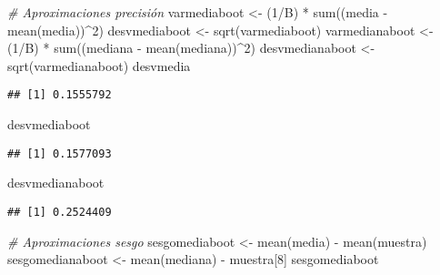 \documentclass[
]{book}
\newenvironment{Shaded}{\begin{snugshade}}{\end{snugshade}}
\newcommand{\CommentTok}[1]{\textcolor[rgb]{0.56,0.35,0.01}{\textit{#1}}}
\newcommand{\DecValTok}[1]{\textcolor[rgb]{0.00,0.00,0.81}{#1}}
\newcommand{\FunctionTok}[1]{\textcolor[rgb]{0.00,0.00,0.00}{#1}}
\newcommand{\NormalTok}[1]{#1}
\newcommand{\OtherTok}[1]{\textcolor[rgb]{0.56,0.35,0.01}{#1}}
\newcommand{\SpecialCharTok}[1]{\textcolor[rgb]{0.00,0.00,0.00}{#1}}
\theoremstyle{break}
\theoremstyle{definition}
\theoremstyle{definition}
\theoremstyle{definition}
\theoremstyle{definition}
\theoremstyle{remark}
\begin{document}
\begin{Shaded}
\begin{Highlighting}[]
\CommentTok{\# Aproximaciones precisión}
\NormalTok{varmediaboot }\OtherTok{\textless{}{-}}\NormalTok{ (}\DecValTok{1}\SpecialCharTok{/}\NormalTok{B) }\SpecialCharTok{*} \FunctionTok{sum}\NormalTok{((media }\SpecialCharTok{{-}} \FunctionTok{mean}\NormalTok{(media))}\SpecialCharTok{\^{}}\DecValTok{2}\NormalTok{)}
\NormalTok{desvmediaboot }\OtherTok{\textless{}{-}} \FunctionTok{sqrt}\NormalTok{(varmediaboot)}
\NormalTok{varmedianaboot }\OtherTok{\textless{}{-}}\NormalTok{ (}\DecValTok{1}\SpecialCharTok{/}\NormalTok{B) }\SpecialCharTok{*} \FunctionTok{sum}\NormalTok{((mediana }\SpecialCharTok{{-}} \FunctionTok{mean}\NormalTok{(mediana))}\SpecialCharTok{\^{}}\DecValTok{2}\NormalTok{)}
\NormalTok{desvmedianaboot }\OtherTok{\textless{}{-}} \FunctionTok{sqrt}\NormalTok{(varmedianaboot)}
\NormalTok{desvmedia}
\end{Highlighting}
\end{Shaded}

\begin{verbatim}
## [1] 0.1555792
\end{verbatim}

\begin{Shaded}
\begin{Highlighting}[]
\NormalTok{desvmediaboot}
\end{Highlighting}
\end{Shaded}

\begin{verbatim}
## [1] 0.1577093
\end{verbatim}

\begin{Shaded}
\begin{Highlighting}[]
\NormalTok{desvmedianaboot}
\end{Highlighting}
\end{Shaded}

\begin{verbatim}
## [1] 0.2524409
\end{verbatim}

\begin{Shaded}
\begin{Highlighting}[]
\CommentTok{\# Aproximaciones sesgo}
\NormalTok{sesgomediaboot }\OtherTok{\textless{}{-}} \FunctionTok{mean}\NormalTok{(media) }\SpecialCharTok{{-}} \FunctionTok{mean}\NormalTok{(muestra)}
\NormalTok{sesgomedianaboot }\OtherTok{\textless{}{-}} \FunctionTok{mean}\NormalTok{(mediana) }\SpecialCharTok{{-}}\NormalTok{ muestra[}\DecValTok{8}\NormalTok{]}
\NormalTok{sesgomediaboot}
\end{Highlighting}
\end{Shaded}
\end{document}
